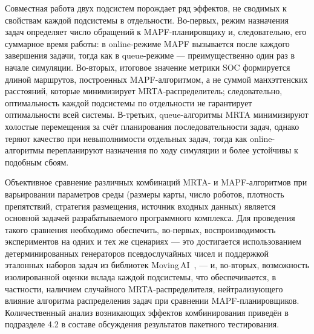 Совместная работа двух подсистем порождает ряд эффектов, не сводимых к свойствам каждой подсистемы в отдельности. Во-первых, режим назначения задач определяет число обращений к MAPF-планировщику и, следовательно, его суммарное время работы: в online-режиме MAPF вызывается после каждого завершения задачи, тогда как в queue-режиме --- преимущественно один раз в начале симуляции. Во-вторых, итоговое значение метрики SOC формируется длиной маршрутов, построенных MAPF-алгоритмом, а не суммой манхэттенских расстояний, которые минимизирует MRTA-распределитель; следовательно, оптимальность каждой подсистемы по отдельности не гарантирует оптимальности всей системы. В-третьих, queue-алгоритмы MRTA минимизируют холостые перемещения за счёт планирования последовательности задач, однако теряют качество при невыполнимости отдельных задач, тогда как online-алгоритмы перепланируют назначения по ходу симуляции и более устойчивы к подобным сбоям.

Объективное сравнение различных комбинаций MRTA- и MAPF-алгоритмов при варьировании параметров среды (размеры карты, число роботов, плотность препятствий, стратегия размещения, источник входных данных) является основной задачей разрабатываемого программного комплекса. Для проведения такого сравнения необходимо обеспечить, во-первых, воспроизводимость экспериментов на одних и тех же сценариях --- это достигается использованием детерминированных генераторов псевдослучайных чисел и поддержкой эталонных наборов задач из библиотек Moving\,AI~\cite{sturtevant2012benchmarks}, --- и, во-вторых, возможность изолированной оценки вклада каждой подсистемы, что обеспечивается, в частности, наличием случайного MRTA-распределителя, нейтрализующего влияние алгоритма распределения задач при сравнении MAPF-планировщиков. Количественный анализ возникающих эффектов комбинирования приведён в подразделе 4.2 в составе обсуждения результатов пакетного тестирования.
